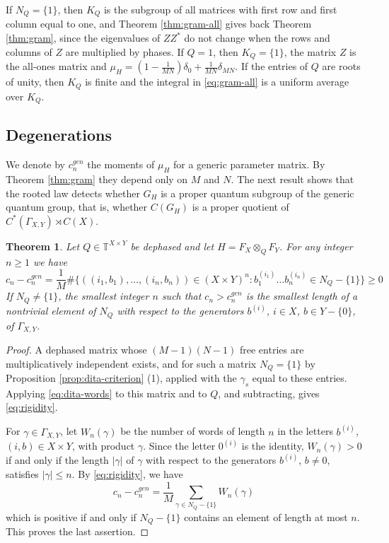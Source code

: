 \documentclass[11pt,reqno]{amsart}
\newtheorem{thm}{Theorem}[section]
\theoremstyle{definition}
\numberwithin{equation}{section}
\begin{document}
If $N_Q=\{1\}$, then $K_Q$ is the subgroup of all matrices with first row and first column equal to one, and Theorem \ref{thm:gram-all} gives back Theorem \ref{thm:gram}, since the eigenvalues of $ZZ^*$ do not change when the rows and columns of $Z$ are multiplied by phases. If $Q=1$, then $K_Q=\{1\}$, the matrix $Z$ is the all-ones matrix and $\mu_H=(1-\frac1{MN})\delta_0+\frac1{MN}\delta_{MN}$. If the entries of $Q$ are roots of unity, then $K_Q$ is finite and the integral in \eqref{eq:gram-all} is a uniform average over $K_Q$.

\subsection{Degenerations}

We denote by $c_n^{gen}$ the moments of $\mu_H$ for a generic parameter matrix. By Theorem \ref{thm:gram} they depend only on $M$ and $N$. The next result shows that the rooted law detects whether $G_H$ is a proper quantum subgroup of the generic quantum group, that is, whether $C(G_H)$ is a proper quotient of $C^*(\Gamma_{X,Y})\rtimes C(X)$.

\begin{thm}\label{thm:rigidity}
Let $Q\in\mathbb T^{X\times Y}$ be dephased and let $H=F_X\otimes_QF_Y$. For any integer $n\geq1$ we have
\begin{equation}\label{eq:rigidity}
c_n-c_n^{gen}=\frac1M\#\Big\{((i_1,b_1),\ldots,(i_n,b_n))\in(X\times Y)^n:b_1^{(i_1)}\ldots b_n^{(i_n)}\in N_Q-\{1\}\Big\}\geq0
\end{equation}
If $N_Q\neq\{1\}$, the smallest integer $n$ such that $c_n>c_n^{gen}$ is the smallest length of a nontrivial element of $N_Q$ with respect to the generators $b^{(i)}$, $i\in X$, $b\in Y-\{0\}$, of $\Gamma_{X,Y}$.
\end{thm}

\begin{proof}
A dephased matrix whose $(M-1)(N-1)$ free entries are multiplicatively independent exists, and for such a matrix $N_Q=\{1\}$ by Proposition \ref{prop:dita-criterion} (1), applied with the $\gamma_s$ equal to these entries. Applying \eqref{eq:dita-words} to this matrix and to $Q$, and subtracting, gives \eqref{eq:rigidity}.

For $\gamma\in\Gamma_{X,Y}$, let $W_n(\gamma)$ be the number of words of length $n$ in the letters $b^{(i)}$, $(i,b)\in X\times Y$, with product $\gamma$. Since the letter $0^{(i)}$ is the identity, $W_n(\gamma)>0$ if and only if the length $|\gamma|$ of $\gamma$ with respect to the generators $b^{(i)}$, $b\neq0$, satisfies $|\gamma|\leq n$. By \eqref{eq:rigidity}, we have
$$c_n-c_n^{gen}=\frac1M\sum_{\gamma\in N_Q-\{1\}}W_n(\gamma)$$
which is positive if and only if $N_Q-\{1\}$ contains an element of length at most $n$. This proves the last assertion.
\end{proof}
\end{document}

